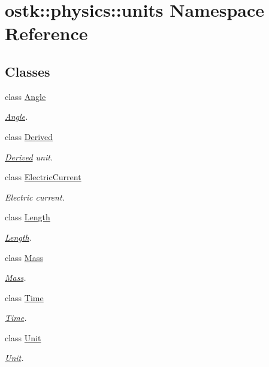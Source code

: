 \hypertarget{namespaceostk_1_1physics_1_1units}{}\section{ostk\+:\+:physics\+:\+:units Namespace Reference}
\label{namespaceostk_1_1physics_1_1units}
\subsection*{Classes}
\begin{DoxyCompactItemize}
\item 
class \hyperlink{classostk_1_1physics_1_1units_1_1_angle}{Angle}
\begin{DoxyCompactList}\small\item\em \hyperlink{classostk_1_1physics_1_1units_1_1_angle}{Angle}. \end{DoxyCompactList}\item 
class \hyperlink{classostk_1_1physics_1_1units_1_1_derived}{Derived}
\begin{DoxyCompactList}\small\item\em \hyperlink{classostk_1_1physics_1_1units_1_1_derived}{Derived} unit. \end{DoxyCompactList}\item 
class \hyperlink{classostk_1_1physics_1_1units_1_1_electric_current}{Electric\+Current}
\begin{DoxyCompactList}\small\item\em Electric current. \end{DoxyCompactList}\item 
class \hyperlink{classostk_1_1physics_1_1units_1_1_length}{Length}
\begin{DoxyCompactList}\small\item\em \hyperlink{classostk_1_1physics_1_1units_1_1_length}{Length}. \end{DoxyCompactList}\item 
class \hyperlink{classostk_1_1physics_1_1units_1_1_mass}{Mass}
\begin{DoxyCompactList}\small\item\em \hyperlink{classostk_1_1physics_1_1units_1_1_mass}{Mass}. \end{DoxyCompactList}\item 
class \hyperlink{classostk_1_1physics_1_1units_1_1_time}{Time}
\begin{DoxyCompactList}\small\item\em \hyperlink{classostk_1_1physics_1_1units_1_1_time}{Time}. \end{DoxyCompactList}\item 
class \hyperlink{classostk_1_1physics_1_1units_1_1_unit}{Unit}
\begin{DoxyCompactList}\small\item\em \hyperlink{classostk_1_1physics_1_1units_1_1_unit}{Unit}. \end{DoxyCompactList}\end{DoxyCompactItemize}
